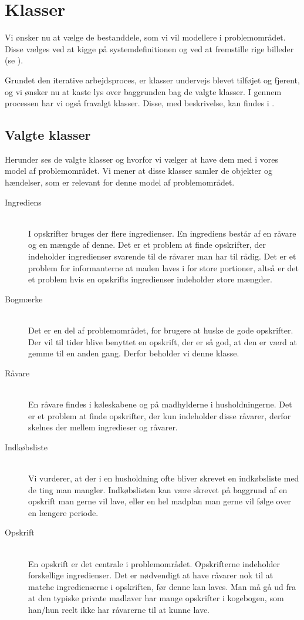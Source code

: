 \section{Klasser}
\label{sec:klasser}
Vi ønsker nu at vælge de bestanddele, som vi vil modellere i problemområdet. Disse vælges
ved at kigge på systemdefinitionen og ved at fremstille rige billeder (se ).

Grundet den iterative arbejdsproces, er klasser undervejs blevet tilføjet og fjerent, og vi ønsker nu at kaste lys over baggrunden bag de valgte klasser. I gennem processen har vi også fravalgt klasser. Disse, med beskrivelse, kan findes i .

\subsection{Valgte klasser}
Herunder ses de valgte klasser og hvorfor vi vælger at have dem med i vores model af problemområdet.
Vi mener at disse klasser samler de objekter og hændelser, som er relevant for denne model af problemområdet.

\begin{description}
\item[Ingrediens] \hfill \\ 
I opskrifter bruges der flere ingredienser. En ingrediens består af en råvare og en mængde af denne. Det er et problem at finde opskrifter, der indeholder ingredienser svarende til de råvarer man har til rådig. Det er et problem for informanterne at maden laves i for store portioner, altså er det et problem hvis en opskrifts ingredienser indeholder store mængder.

\item[Bogmærke] \hfill \\
Det er en del af problemområdet, for brugere at huske de gode opskrifter. Der vil til tider blive benyttet en opskrift, der er så god, at den er værd at gemme til en anden gang. Derfor beholder vi denne klasse.

\item[Råvare] \hfill \\
En råvare findes i køleskabene og på madhylderne i husholdningerne. Det er et problem at finde opskrifter, der kun indeholder disse råvarer, derfor skelnes der mellem ingredieser og råvarer.

\item[Indkøbsliste] \hfill \\
Vi vurderer, at der i en husholdning ofte bliver skrevet en indkøbsliste med de ting man mangler. Indkøbslisten kan være skrevet på baggrund af en opskrift man gerne vil lave, eller en hel madplan man gerne vil følge over en længere periode.

\item[Opskrift] \hfill \\
En opskrift er det centrale i problemområdet. Opskrifterne indeholder forskellige ingredienser. Det er nødvendigt at have råvarer nok til at matche ingredienserne i opskriften, før denne kan laves. Man må gå ud fra at den typiske private madlaver har mange opskrifter i kogebogen, som han/hun reelt ikke har råvarerne til at kunne lave.
\end{description}

